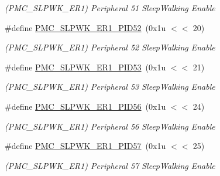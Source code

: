 \begin{DoxyCompactItemize}
\begin{DoxyCompactList}\small\item\em (P\+M\+C\+\_\+\+S\+L\+P\+W\+K\+\_\+\+E\+R1) Peripheral 51 Sleep\+Walking Enable \end{DoxyCompactList}\item 
\mbox{\label{group__SAMS70__PMC_ga86c00b4ba113acdbff47547443c88252}} 
\#define \mbox{\hyperlink{group__SAMS70__PMC_ga86c00b4ba113acdbff47547443c88252}{P\+M\+C\+\_\+\+S\+L\+P\+W\+K\+\_\+\+E\+R1\+\_\+\+P\+I\+D52}}~(0x1u $<$$<$ 20)
\begin{DoxyCompactList}\small\item\em (P\+M\+C\+\_\+\+S\+L\+P\+W\+K\+\_\+\+E\+R1) Peripheral 52 Sleep\+Walking Enable \end{DoxyCompactList}\item 
\mbox{\label{group__SAMS70__PMC_gaf34707cc2f73df5e1a0d681c342273ef}} 
\#define \mbox{\hyperlink{group__SAMS70__PMC_gaf34707cc2f73df5e1a0d681c342273ef}{P\+M\+C\+\_\+\+S\+L\+P\+W\+K\+\_\+\+E\+R1\+\_\+\+P\+I\+D53}}~(0x1u $<$$<$ 21)
\begin{DoxyCompactList}\small\item\em (P\+M\+C\+\_\+\+S\+L\+P\+W\+K\+\_\+\+E\+R1) Peripheral 53 Sleep\+Walking Enable \end{DoxyCompactList}\item 
\mbox{\label{group__SAMS70__PMC_ga9792ce89c425d8a5f48138e4c2d9207a}} 
\#define \mbox{\hyperlink{group__SAMS70__PMC_ga9792ce89c425d8a5f48138e4c2d9207a}{P\+M\+C\+\_\+\+S\+L\+P\+W\+K\+\_\+\+E\+R1\+\_\+\+P\+I\+D56}}~(0x1u $<$$<$ 24)
\begin{DoxyCompactList}\small\item\em (P\+M\+C\+\_\+\+S\+L\+P\+W\+K\+\_\+\+E\+R1) Peripheral 56 Sleep\+Walking Enable \end{DoxyCompactList}\item 
\mbox{\label{group__SAMS70__PMC_gab571b69744492177d28d2cd369fc9557}} 
\#define \mbox{\hyperlink{group__SAMS70__PMC_gab571b69744492177d28d2cd369fc9557}{P\+M\+C\+\_\+\+S\+L\+P\+W\+K\+\_\+\+E\+R1\+\_\+\+P\+I\+D57}}~(0x1u $<$$<$ 25)
\begin{DoxyCompactList}\small\item\em (P\+M\+C\+\_\+\+S\+L\+P\+W\+K\+\_\+\+E\+R1) Peripheral 57 Sleep\+Walking Enable \end{DoxyCompactList}\item 

\end{DoxyCompactItemize}
